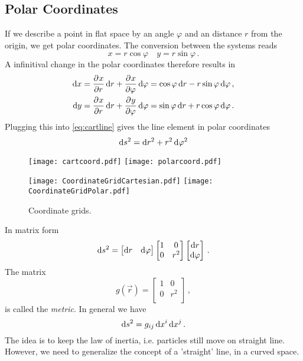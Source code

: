 \subsection*{Polar Coordinates}
If we describe a point in flat space by an angle $\varphi$ and an distance $r$
from the origin, we get polar coordinates. The conversion between the systems
reads
\begin{equation}
    x= r\cos\varphi\quad y= r\sin\varphi\,.
\end{equation}
A infinitival change in the polar coordinates therefore results in 
\begin{align}
    \dif x&= \dpd{x}{r}\dif r+\dpd{x}{\varphi}\dif \varphi = \cos\varphi\dif
    r-r\sin\varphi\dif \varphi\,,\\
    \dif y&= \dpd{x}{r}\dif r+\dpd{y}{\varphi}\dif \varphi = \sin\varphi\dif
    r+r\cos\varphi\dif \varphi\,.
\end{align}
Plugging this into \eqref{eq:cartline} gives the line element in polar coordinates
\begin{equation}
    \dif s^2=\dif r^2+r^2\dif \varphi^2
\end{equation}
\begin{figure}[hbtp!]
\centering
 \texttt{[image: cartcoord.pdf]}
 \texttt{[image: polarcoord.pdf]}
\caption{}
\end{figure}
\begin{figure}[hbtp!]
\centering
 \texttt{[image: CoordinateGridCartesian.pdf]}\quad
 \texttt{[image: CoordinateGridPolar.pdf]}
\caption{Coordinate grids.}
\end{figure}

In matrix form
\begin{equation}
\dif s^2=
\begin{bmatrix}
\dif r& \dif \varphi
\end{bmatrix}
\begin{bmatrix}
1& 0\\
0& r^2\\
\end{bmatrix}
\begin{bmatrix}
\dif r\\ \dif \varphi
\end{bmatrix}\, .
\end{equation}
The matrix
\begin{equation}
g(\vec{r})=
\begin{bmatrix}
1& 0\\
0& r^2\\
\end{bmatrix}\, ,
\end{equation}
is called the \emph{metric}.
In general we have
\begin{equation}
    \dif s^2 = g_{ij}\dif x^i\dif x^j\, .
\end{equation}
The idea is to keep the law of inertia, i.e. particles still move on straight
line. However, we need to generalize the concept of a 'straight' line, in a
curved space.

